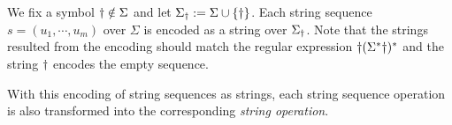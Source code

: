 
 
We fix a symbol $\dag\notin\Sigma$ and let $\Sigma_{\dag}:=\Sigma \cup \{\dag\}$.
Each string sequence  $s = (u_1, \cdots, u_m)$ over $\Sigma$ is encoded as a string   over $\Sigma_{\dag}$. %
Note that the strings %
resulted from the encoding should match the regular expression $\dag (\Sigma^* \dag)^*$ and the string $\dag$ encodes the empty sequence.

With this encoding of string sequences as strings, each string sequence operation is also transformed into the corresponding \emph{string operation}. 
%

